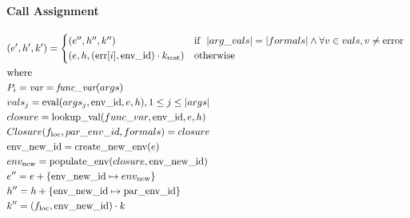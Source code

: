 \documentclass[runningheads]{llncs}
\newcommand{\lit}[1]{\textit{#1}}
\newcommand{\state}[3]{(#1, #2, #3)} %
\newcommand{\context}[2]{(#1, #2)} %
\newcommand{\lookupval}{\text{lookup\_val}}
\newcommand{\evalexpr}{\text{eval}}
\newcommand{\createnewenv}{\text{create\_new\_env}}
\begin{document}
\paragraph{Call Assignment}
\begin{displaymath}
	\begin{aligned}
		 & \state{e'}{h'}{k'}           =
		\begin{cases*}
			\state{e''}{h''}{k''}                                                       & \text{if } $|arg\_vals| = |formals| \land \forall v \in vals, v \neq \text{error}$ \\
			\state{e}{h}{\context{\text{err}[i]}{\text{env\_id}} \cdot k_{\text{rest}}} & otherwise
		\end{cases*}
		\\
		 & \text{where}
		\\
		 & P_{i}                          = \lit{var} = \lit{func\_var}(args)                               \\
		 & vals_{j}                       = \evalexpr(args_{j}, \text{env\_id}, e, h), 1 \leq j \leq |args| \\
		 & closure     = \lookupval(func\_var, \text{env\_id}, e, h)                                        \\
		 & Closure(f_{\text{loc}}, par\_env\_id, formals) = closure                                         \\
		 & \text{env\_new\_id}            = \createnewenv(e)                                                \\
		 & env_{\text{new}} = \text{populate\_env}(closure, \text{env\_new\_id})                            \\
		 & e'' = e + \{ \text{env\_new\_id} \mapsto env_{\text{new}} \}                                     \\
		 & h'' = h + \{\text{env\_new\_id} \mapsto \text{par\_env\_id}\}                                    \\
		 & k'' = \context{f_{\text{loc}}}{\text{env\_new\_id}} \cdot k
	\end{aligned}
\end{displaymath}
\end{document}
